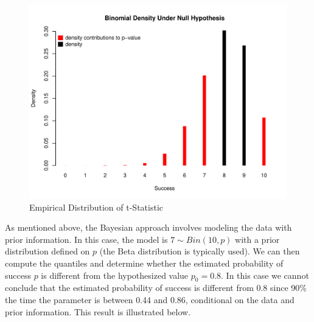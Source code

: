 \documentclass[12pt]{article}
\begin{document}
\begin{figure}[H]\caption[]{Empirical Distribution of t-Statistic}
\centering
\begin{minipage}{0.6\linewidth}
\includegraphics[trim={0cm 0cm 0cm 1.5cm}, clip, scale=0.6]{../figs/bintest_dist.pdf}
\end{minipage}
\end{figure}

\noindent As mentioned above, the Bayesian approach involves modeling the data with prior information. In this case, the model is $7 \sim Bin(10, p)$ with a prior distribution defined on $p$ (the Beta distribution is typically used). We can then compute the quantiles and determine whether the estimated probability of success $p$ is different from the hypothesized value $p_0 = 0.8$. In this case we cannot conclude that the estimated probability of success is different from 0.8 since 90\% the time the parameter is between 0.44 and 0.86, conditional on the data and prior information. This result is illustrated below. \\
\end{document}
